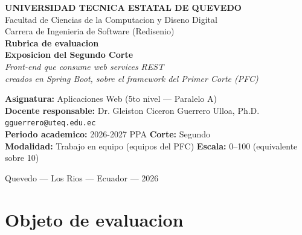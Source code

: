 \documentclass[11pt,a4paper]{article}
\begin{document}
\color{textogris}

\begin{center}
	\vspace*{0.4cm}
	{\Large\bfseries\textcolor{uteqverde}{UNIVERSIDAD TECNICA ESTATAL DE QUEVEDO}}\\[4pt]
	{\large Facultad de Ciencias de la Computacion y Diseno Digital}\\[2pt]
	{\large Carrera de Ingenieria de Software (Redisenio)}\\[14pt]

	{\LARGE\bfseries Rubrica de evaluacion}\\[4pt]
	{\LARGE\bfseries Exposicion del Segundo Corte}\\[10pt]

	{\large\itshape Front-end que consume web services REST}\\
	{\large\itshape creados en Spring Boot, sobre el framework del Primer Corte (PFC)}\\[14pt]

	\begin{tcolorbox}[colback=uteqverde!8,colframe=uteqverde,arc=3pt,
	                  width=0.92\textwidth,boxrule=0.8pt]
		\centering
		\textbf{Asignatura:} Aplicaciones Web (5to nivel --- Paralelo A)\\[2pt]
		\textbf{Docente responsable:} Dr. Gleiston Ciceron Guerrero Ulloa, Ph.D.\\[2pt]
		\texttt{gguerrero@uteq.edu.ec}\\[4pt]
		\textbf{Periodo academico:} 2026-2027 PPA \quad\textbar\quad \textbf{Corte:} Segundo\\[2pt]
		\textbf{Modalidad:} Trabajo en equipo (equipos del PFC) \quad\textbar\quad \textbf{Escala:} 0--100 (equivalente sobre 10)
	\end{tcolorbox}

	\vspace{0.4cm}
	{\small Quevedo --- Los Rios --- Ecuador --- 2026}
\end{center}

\vspace{0.2cm}

\section{Objeto de evaluacion}
\end{document}

